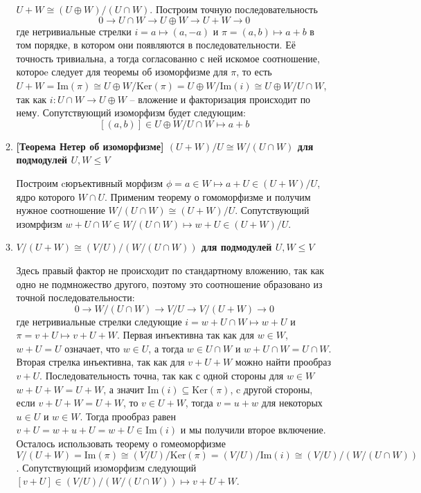 \documentclass{article}
\begin{document}
\begin{enumerate}
\begin{enumerate}
                $U+W\cong (U\oplus W)/(U\cap W)$. Построим точную последовательность
                \[
                    0\rightarrow U\cap W\rightarrow U\oplus W\rightarrow U+W\rightarrow 0
                \]
                где нетривиальные стрелки $i=a\mapsto (a,-a)$ и $\pi=(a,b)\mapsto a+b$ в том порядке, в котором они появляются
                в последовательности. Её точность тривиальна, а тогда согласованно с ней искомое соотношение, котороe
                следует для теоремы об изоморфизме для $\pi$, то есть $U+W=\text{Im}(\pi)\cong U\oplus W/\text{Ker}(\pi)
                = U\oplus W/\text{Im}(i)\cong U\oplus W/U\cap W$, так как $i : U\cap W\rightarrow U\oplus W$ – вложение и
                факторизация происходит по нему. Сопутствующий изоморфизм будет следующим:
                \[[(a,b)]\in U\oplus W/U\cap W \mapsto a+b\]

            \item \textbf{[Теорема Нетер об изоморфизме] $(U+W)/U\cong W/(U\cap W)$ для подмодулей $U,W\leq V$}

                Построим cюръективный морфизм $\phi = a\in W\mapsto a+U\in(U+W)/U$, ядро которого $W\cap U$. Применим
                теорему о гомоморфизме и получим нужное соотношение $W/(U\cap W)\cong (U+W)/U$. Сопутствующий изомрфизм
                $w+U\cap W\in W/(U\cap W)\mapsto w+U\in (U+W)/U$.

            \item \textbf{$V/(U+W)\cong (V/U)/(W/(U\cap W))$ для подмодулей $U,W\leq V$}

                Здесь правый фактор не происходит по стандартному вложению, так как одно не подмножество другого,
                поэтому это соотношение образовано из точной последовательности:
                \[0\rightarrow W/(U\cap W)\rightarrow V/U\rightarrow V/(U+W)\rightarrow 0\]
                где нетривиальные стрелки следующие $i=w+U\cap W\mapsto w+U$ и $\pi=v+U\mapsto v+U+W$. Первая
                инъективна так как для $w\in W$, $w+U=U$ означает, что $w\in U$, а тогда $w\in U\cap W$ и $w+U\cap W=
                U\cap W$. Вторая стрелка инъективна, так как для $v+U+W$ можно найти прообраз $v+U$. Последовательность
                точна, так как с одной стороны для $w\in W$ $w+U+W=U+W$, а значит $\text{Im}(i)\subseteq\text{Ker}(\pi)$,
                c другой стороны, если $v+U+W=U+W$, то $v\in U+W$, тогда $v=u+w$ для некоторых $u\in U$ и $w\in W$.
                Тогда прообраз равен $v+U=w+u+U=w+U\in\text{Im}(i)$ и мы получили второе включение. Осталось использовать
                теорему о гомеоморфизме $V/(U+W)=\text{Im}(\pi)\cong(V/U)/\text{Ker}(\pi)=(V/U)/\text{Im}(i)\cong(V/U)/(W/(U\cap W))$.
                Сопутствующий изоморфизм следующий $[v+U]\in(V/U)/(W/(U\cap W))\mapsto v+U+W$. 


\end{enumerate}
\end{enumerate}
\end{document}
